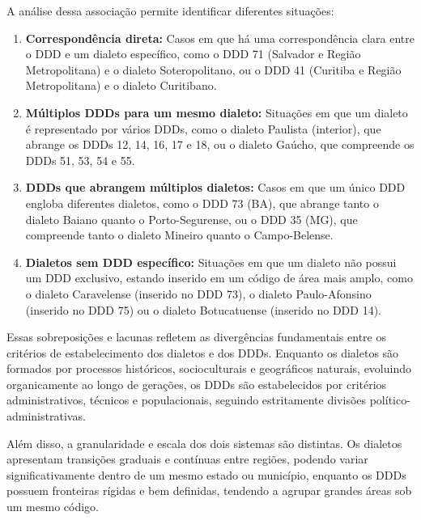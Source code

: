 A análise dessa associação permite identificar diferentes situações:
\begin{enumerate}
    \item \textbf{Correspondência direta:} Casos em que há uma correspondência clara entre o DDD e um dialeto específico, como o DDD 71 (Salvador e Região Metropolitana) e o dialeto Soteropolitano, ou o DDD 41 (Curitiba e Região Metropolitana) e o dialeto Curitibano.
    \item \textbf{Múltiplos DDDs para um mesmo dialeto:} Situações em que um dialeto é representado por vários DDDs, como o dialeto Paulista (interior), que abrange os DDDs 12, 14, 16, 17 e 18, ou o dialeto Gaúcho, que compreende os DDDs 51, 53, 54 e 55.
    \item \textbf{DDDs que abrangem múltiplos dialetos:} Casos em que um único DDD engloba diferentes dialetos, como o DDD 73 (BA), que abrange tanto o dialeto Baiano quanto o Porto-Segurense, ou o DDD 35 (MG), que compreende tanto o dialeto Mineiro quanto o Campo-Belense.
    \item \textbf{Dialetos sem DDD específico:} Situações em que um dialeto não possui um DDD exclusivo, estando inserido em um código de área mais amplo, como o dialeto Caravelense (inserido no DDD 73), o dialeto Paulo-Afonsino (inserido no DDD 75) ou o dialeto Botucatuense (inserido no DDD 14).
\end{enumerate}

Essas sobreposições e lacunas refletem as divergências fundamentais entre os critérios de estabelecimento dos dialetos e dos DDDs. Enquanto os dialetos são formados por processos históricos, socioculturais e geográficos naturais, evoluindo organicamente ao longo de gerações, os DDDs são estabelecidos por critérios administrativos, técnicos e populacionais, seguindo estritamente divisões político-administrativas.

Além disso, a granularidade e escala dos dois sistemas são distintas. Os dialetos apresentam transições graduais e contínuas entre regiões, podendo variar significativamente dentro de um mesmo estado ou município, enquanto os DDDs possuem fronteiras rígidas e bem definidas, tendendo a agrupar grandes áreas sob um mesmo código.




